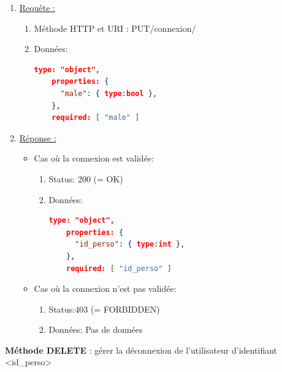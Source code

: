 \documentclass[11pt, a4paper]{article}
\begin{document}
  \begin{enumerate}
   \item \underline{Requête :}
    \begin{enumerate}
     \item Méthode HTTP et URI : PUT/connexion/
     \item Données:
	\begin{lstlisting}[language=JSON]
	type: "object",
	properties: {
	  "male": { type:bool },
	},
	required: [ "male" ]
	\end{lstlisting}
	     
    \end{enumerate}

   \item \underline{Réponse :}
   \begin{itemize}
    \item Cas où la connexion est validée:
    \begin{enumerate}
     \item Status: 200 (= OK)
     \item Données:
	\begin{lstlisting}[language=JSON]
	type: "object",
	properties: {
	  "id_perso": { type:int },
	},
	required: [ "id_perso" ]
	\end{lstlisting} 
    \end{enumerate}

    \item Cas où la connexion n'est pas validée:
    \begin{enumerate}
     \item Status:403 (= FORBIDDEN)
     \item Données: Pas de données\\
    \end{enumerate}
    
   \end{itemize}

  \end{enumerate}
  
  \textbf{Méthode DELETE} : gérer la déconnexion de l'utilisateur d'identifiant <id\_perso>
  
\end{document}
